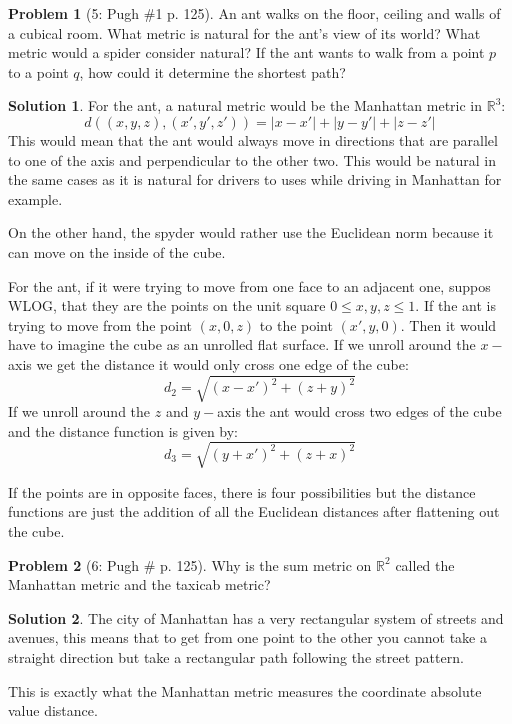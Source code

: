 \documentclass{article}
\theoremstyle{definition}
\newtheorem*{soln}{Solution}
\newtheorem*{prob}{Problem}
\theoremstyle{theorem}
\newcommand{\R}{\mathbb{R}}
\begin{document}
\begin{prob}[5: Pugh \#1 p. 125]
    An ant walks on the floor, ceiling and walls of a cubical room. What metric is natural for the ant's view of its world? What metric would a spider consider natural? If the ant wants to walk from a point $p$ to a point $q$, how could it determine the shortest path?
\end{prob}
\begin{soln}
For the ant, a natural metric would be the Manhattan metric in $\R^3$:
    $$d((x,y,z),(x',y',z')) = |x-x'| + |y-y'| + |z-z'|$$
    This would mean that the ant would always move in directions that are parallel to one of the axis and perpendicular to the other two. This would be natural in the same cases as it is natural for drivers to uses while driving in Manhattan for example. 

    On the other hand, the spyder would rather use the Euclidean norm because it can move on the inside of the cube.

    For the ant, if it were trying to move from one face to an adjacent one, suppos WLOG, that they are the points on the unit square $0\leq x,y,z\leq 1$. If the ant is trying to move from the point $(x,0,z)$ to the point $(x',y,0)$. Then it would have to imagine the cube as an unrolled flat surface. If we unroll around the $x-$axis we get the distance it would only cross one edge of the cube:
    $$d_2 = \sqrt{(x-x')^2 + (z+y)^2}$$
    If we unroll around the $z$ and $y-$axis the ant would cross two edges of the cube and the distance function is given by:
    $$d_3=\sqrt{(y+x')^2 +(z+x)^2}$$
    
    If the points are in opposite faces, there is four possibilities but the distance functions are just the addition of all the Euclidean distances after flattening out the cube.
\end{soln}
\vspace{1in}


\begin{prob}[6: Pugh \# p. 125]
    Why is the sum metric on $\R^2$ called the Manhattan metric and the taxicab metric?
\end{prob}
\begin{soln}

    The city of Manhattan has a very rectangular system of streets and avenues, this means that to get from one point to the other you cannot take a straight direction but take a rectangular path following the street pattern. 

    This is exactly what the Manhattan metric measures the coordinate absolute value distance.
\end{soln}
\vspace{1in}
\end{document}

